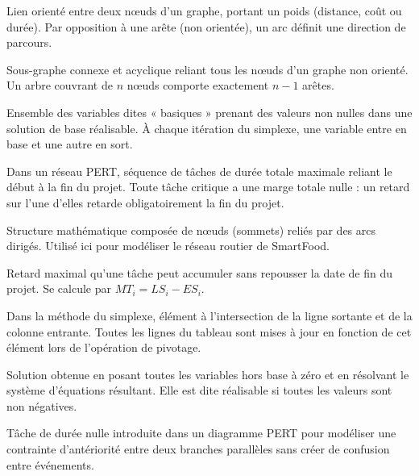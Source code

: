 \documentclass[12pt,a4paper]{article}
\begin{document}
\begin{description}[style=nextline, leftmargin=0.5cm]

  \item[\textbf{Arc}]
  Lien orienté entre deux nœuds d'un graphe, portant un poids (distance, coût ou durée).
  Par opposition à une arête (non orientée), un arc définit une direction de parcours.

  \item[\textbf{Arbre couvrant}]
  Sous-graphe connexe et acyclique reliant tous les nœuds d'un graphe non orienté.
  Un arbre couvrant de $n$ nœuds comporte exactement $n-1$ arêtes.

  \item[\textbf{Base (simplexe)}]
  Ensemble des variables dites « basiques » prenant des valeurs non nulles dans une
  solution de base réalisable. À chaque itération du simplexe, une variable entre en
  base et une autre en sort.

  \item[\textbf{Chemin critique}]
  Dans un réseau PERT, séquence de tâches de durée totale maximale reliant le début
  à la fin du projet. Toute tâche critique a une marge totale nulle : un retard sur
  l'une d'elles retarde obligatoirement la fin du projet.

  \item[\textbf{Graphe orienté}]
  Structure mathématique composée de nœuds (sommets) reliés par des arcs dirigés.
  Utilisé ici pour modéliser le réseau routier de SmartFood.

  \item[\textbf{Marge totale}]
  Retard maximal qu'une tâche peut accumuler sans repousser la date de fin du projet.
  Se calcule par $MT_i = LS_i - ES_i$.

  \item[\textbf{Pivot}]
  Dans la méthode du simplexe, élément à l'intersection de la ligne sortante et de
  la colonne entrante. Toutes les lignes du tableau sont mises à jour en fonction de
  cet élément lors de l'opération de pivotage.

  \item[\textbf{Solution de base réalisable}]
  Solution obtenue en posant toutes les variables hors base à zéro et en résolvant
  le système d'équations résultant. Elle est dite réalisable si toutes les valeurs
  sont non négatives.

  \item[\textbf{Tâche fictive}]
  Tâche de durée nulle introduite dans un diagramme PERT pour modéliser une contrainte
  d'antériorité entre deux branches parallèles sans créer de confusion entre événements.


\end{description}
\end{document}
